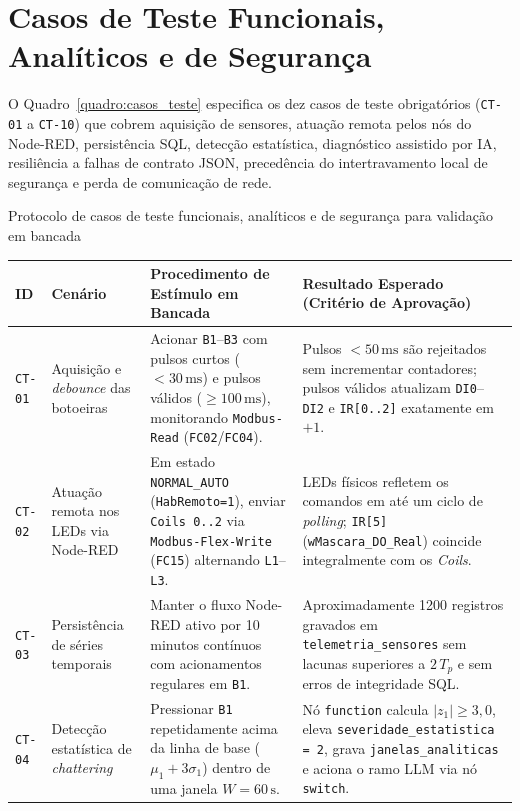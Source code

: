 \section{Casos de Teste Funcionais, Analíticos e de Segurança}
\label{sec:val_casos}

O Quadro~\ref{quadro:casos_teste} especifica os dez casos de teste obrigatórios (\texttt{CT-01} a \texttt{CT-10}) que cobrem aquisição de sensores, atuação remota pelos nós do Node-RED, persistência SQL, detecção estatística, diagnóstico assistido por IA, resiliência a falhas de contrato JSON, precedência do intertravamento local de segurança e perda de comunicação de rede.

\begin{quadro}[htb]
  \centering
  \SingleSpacing
  \caption{Protocolo de casos de teste funcionais, analíticos e de segurança para validação em bancada}
  \label{quadro:casos_teste}
  \footnotesize
  \begin{tabularx}{\textwidth}{|p{1.05cm}|p{2.45cm}|L|L|}
    \hline
    \textbf{ID} & \textbf{Cenário} & \textbf{Procedimento de Estímulo em Bancada} & \textbf{Resultado Esperado (Critério de Aprovação)} \\
    \hline
    \texttt{CT-01} & Aquisição e \textit{debounce} das botoeiras & Acionar \texttt{B1}--\texttt{B3} com pulsos curtos ($< 30\,\text{ms}$) e pulsos válidos ($\ge 100\,\text{ms}$), monitorando \texttt{Modbus-Read} (\texttt{FC02}/\texttt{FC04}). & Pulsos $< 50\,\text{ms}$ são rejeitados sem incrementar contadores; pulsos válidos atualizam \texttt{DI0}--\texttt{DI2} e \texttt{IR[0..2]} exatamente em $+1$. \\
    \hline
    \texttt{CT-02} & Atuação remota nos LEDs via Node-RED & Em estado \texttt{NORMAL\_AUTO} (\texttt{HabRemoto=1}), enviar \texttt{Coils 0..2} via \texttt{Modbus-Flex-Write} (\texttt{FC15}) alternando \texttt{L1}--\texttt{L3}. & LEDs físicos refletem os comandos em até um ciclo de \textit{polling}; \texttt{IR[5]} (\texttt{wMascara\_DO\_Real}) coincide integralmente com os \textit{Coils}. \\
    \hline
    \texttt{CT-03} & Persistência de séries temporais & Manter o fluxo Node-RED ativo por 10 minutos contínuos com acionamentos regulares em \texttt{B1}. & Aproximadamente 1200 registros gravados em \texttt{telemetria\_sensores} sem lacunas superiores a $2\,T_p$ e sem erros de integridade SQL. \\
    \hline
    \texttt{CT-04} & Detecção estatística de \textit{chattering} & Pressionar \texttt{B1} repetidamente acima da linha de base ($\mu_1 + 3\sigma_1$) dentro de uma janela $W = 60\,\text{s}$. & Nó \texttt{function} calcula $|z_1| \ge 3{,}0$, eleva \texttt{severidade\_estatistica = 2}, grava \texttt{janelas\_analiticas} e aciona o ramo LLM via nó \texttt{switch}. \\

\end{tabularx}
\end{quadro}
